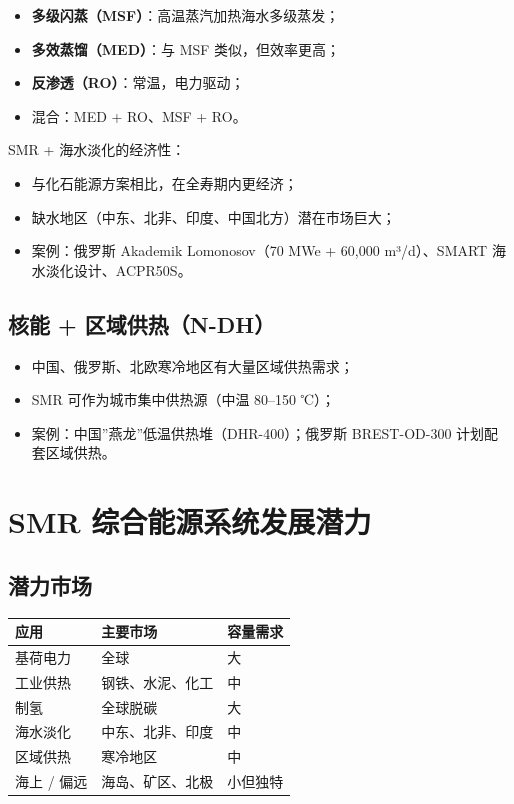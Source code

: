 \documentclass[
  UTF8,
  scheme=plain,
  fontsize=10pt,
  openany
]{ctexbook}
\begin{document}
\begin{itemize}
\tightlist
\item
  \textbf{多级闪蒸（MSF）}：高温蒸汽加热海水多级蒸发；
\item
  \textbf{多效蒸馏（MED）}：与 MSF 类似，但效率更高；
\item
  \textbf{反渗透（RO）}：常温，电力驱动；
\item
  混合：MED + RO、MSF + RO。
\end{itemize}

SMR + 海水淡化的经济性：

\begin{itemize}
\tightlist
\item
  与化石能源方案相比，在全寿期内更经济；
\item
  缺水地区（中东、北非、印度、中国北方）潜在市场巨大；
\item
  案例：俄罗斯 Akademik Lomonosov（70 MWe + 60,000 m³/d）、SMART
  海水淡化设计、ACPR50S。
\end{itemize}

\subsection{核能 +
区域供热（N-DH）}\label{ux6838ux80fd-ux533aux57dfux4f9bux70edn-dh}

\begin{itemize}
\tightlist
\item
  中国、俄罗斯、北欧寒冷地区有大量区域供热需求；
\item
  SMR 可作为城市集中供热源（中温 80--150 ℃）；
\item
  案例：中国''燕龙''低温供热堆（DHR-400）；俄罗斯 BREST-OD-300
  计划配套区域供热。
\end{itemize}

\section{SMR
综合能源系统发展潜力}\label{smr-ux7efcux5408ux80fdux6e90ux7cfbux7edfux53d1ux5c55ux6f5cux529b}

\subsection{潜力市场}\label{ux6f5cux529bux5e02ux573a}

{\def\LTcaptype{none} %
\begin{longtable}[]{@{}lll@{}}
\toprule\noalign{}
应用 & 主要市场 & 容量需求 \\
\midrule\noalign{}
\endhead
\bottomrule\noalign{}
\endlastfoot
基荷电力 & 全球 & 大 \\
工业供热 & 钢铁、水泥、化工 & 中 \\
制氢 & 全球脱碳 & 大 \\
海水淡化 & 中东、北非、印度 & 中 \\
区域供热 & 寒冷地区 & 中 \\
海上 / 偏远 & 海岛、矿区、北极 & 小但独特 \\
\end{longtable}
}
\end{document}
